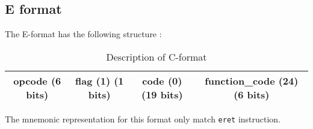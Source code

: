 \subsection*{E format}

	The E-format has the following structure :
	\begin{table}[H]
		\centering
		\begin{tabular}{|c|c|c|c|}
		\hline 
		opcode (6 bits) & flag (1) (1 bits) & code (0) (19 bits) & function\_code (24) (6 bits) \\ 
		\hline 
		\end{tabular} 
		\caption{Description of C-format}
	\end{table}
	
	The mnemonic representation for this format only match \verb?eret? instruction.